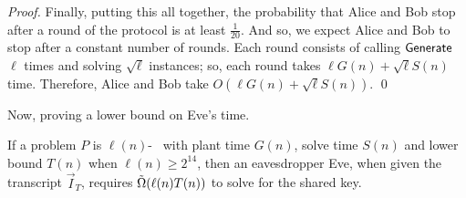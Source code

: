 \begin{proof}
	Finally, putting this all together, the probability that Alice and Bob stop after a round of the protocol is at least $\frac 1 {20}$. And so, we expect Alice and Bob to stop after a constant number of rounds. Each round consists of calling $\Generate$ $\ell$ times and solving $\sqrt{\ell}$ instances; so, each round takes $\ell G(n) + \sqrt{\ell}S(n)$ time. Therefore, Alice and Bob take $O(\ell G(n) + \sqrt{\ell}S(n))$.
	\qed
\end{proof}

Now, proving a lower bound on Eve's time.
\begin{lemma}
	If a problem $P$ is $\ell(n)$-\keyER~ with plant time $G(n)$, solve time $S(n)$ and lower bound $T(n)$ when $\ell(n)\ge 2^{14}$,
	then an eavesdropper Eve, when given the transcript $\vec I_T$, requires $\~\Omega(\ell(n) T(n))$ to solve for the shared key.
\end{lemma}
